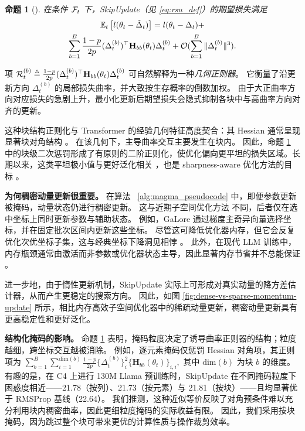 \documentclass[11pt, a4paper, twocolumn, copyright, goog]{google}
\theoremstyle{plain}
\newtheorem{proposition}[theorem]{命题}
\theoremstyle{definition}
\theoremstyle{remark}
\begin{document}
\begin{proposition}[] \label{lemma:implicit_reg}
在条件 ${\mathcal{F}}_t$ 下，SkipUpdate（见 \eqref{eq:rsu_def}）的期望损失满足
\begin{multline} \label{eq:implicit_reg}
    \mathbb{E}_t\left[l(\theta_t-\tilde{\Delta}_t) \right] = l(\theta_t-\Delta_t) + \\
    \sum_{b=1}^B \frac{1-p}{2p} (\Delta_t^{(b)})^\top  \mathbf{H}_{bb}(\theta_t) \Delta_t^{(b)}
    + {\mathcal{O}}(\sum_{b=1}^B \|\Delta_t^{(b)}\|^3).
\end{multline}
\end{proposition}


项 ${\mathcal{R}}_t^{(b)} \triangleq \frac{1-p}{2p} (\Delta_t^{(b)})^\top \mathbf{H}_{bb}(\theta_t) \Delta_t^{(b)}$ 可自然解释为一种\emph{几何正则器}。 
它衡量了沿更新方向 $\Delta_t^{(b)}$ 的局部损失曲率，并大致按生存概率的倒数加权。 
由于大正曲率方向对应损失的急剧上升，最小化更新后期望损失会隐式抑制各块中与高曲率方向对齐的更新。 


这种块结构正则化与 Transformer 的经验几何特征高度契合：其 Hessian 通常呈现显著块对角结构 \citep{zhang2024transformers,kunstner2024heavy,ormaniec2024does}。
在该几何下，主导曲率交互主要发生在块内。 
因此，命题 \ref{lemma:implicit_reg} 中的块级二次惩罚形成了有原则的二阶正则化，使优化偏向更平坦的损失区域。长期以来，这类平坦极小值与更好泛化相关 \citep{hochreiter1997flat,keskar2016large}，也是 sharpness-aware 优化方法的目标 \citep{foret2020sharpness}。




\textbf{为何稠密动量更新很重要。}
在算法 ~\ref{alg:magma_pseudocode} 中，即便参数更新被掩码，动量状态仍进行稠密更新。 
这与近期子空间优化方法 \citep{pan2024lisa,zhao2024galore,luo2024badam} 不同，后者仅在选中坐标上同时更新参数与辅助状态。
例如，GaLore \citep{zhao2024galore} 通过梯度主奇异向量选择坐标，并在固定批次区间内更新这些坐标。
尽管这可降低优化器内存，但它会反复优化次优坐标子集，这与经典坐标下降洞见相悖 \citep{nesterov2012efficiency,nutini2017let}。
此外，在现代 LLM 训练中，内存瓶颈通常由激活而非参数或优化器状态主导，因此显著内存节省并不总能保证 \citep{zhang2024revisiting,shamshoum2025compact}。



进一步地，由于惰性更新机制，SkipUpdate 实际上可形成对真实动量的降方差估计器，从而产生更稳定的搜索方向。
因此，如图 \ref{fig:dense-vs-sparse-momentum-update} 所示，相比内存高效子空间优化器中的稀疏动量更新，稠密动量更新具有更高稳定性和更好泛化。




\textbf{结构化掩码的影响。}
命题 \ref{lemma:implicit_reg} 表明，掩码粒度决定了诱导曲率正则器的结构；粒度越细，跨坐标交互越被消除。
例如，逐元素掩码仅惩罚 Hessian 对角项，其正则项为 $\sum_{b=1}^B \sum_{i=1}^{\textrm{dim}(b)} \frac{1-p}{2p} \{ \Delta_t^{(b)} \}_{i}^2   \{ \mathbf{H}_{bb}(\theta_t) \}_{i,i},$ 其中 $\textrm{dim}(b)$ 为块 $b$ 的维度。
有趣的是，在 C4 上进行 130M Llama 预训练时，SkipUpdate 在不同掩码粒度下困惑度相近——21.78（按列）、21.73（按元素）与 21.81（按块）——且均显著优于 RMSProp 基线（22.64）。
我们推测，这种近似等价反映了对角预条件难以充分利用块内稠密曲率，因此更细粒度掩码的实际收益有限。
因此，我们采用按块掩码，因为跳过整个块可带来更优的计算性质与操作裁剪效率。
\end{document}
